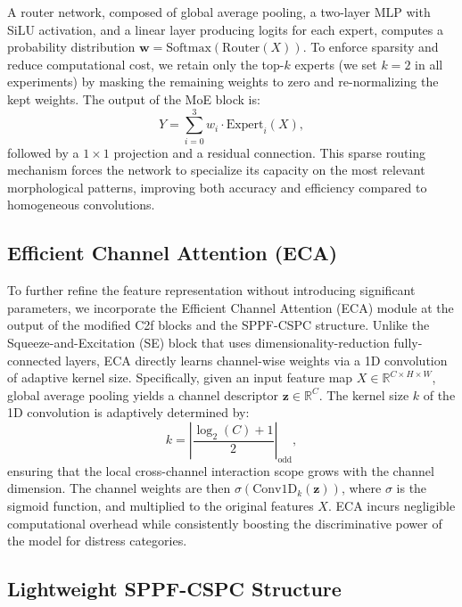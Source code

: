 \documentclass{ieeeaccess}
\begin{document}
{A router network, composed of global average pooling, a two-layer MLP with SiLU activation, and a linear layer producing logits for each expert, computes a probability distribution $\mathbf{w} = \text{Softmax}(\text{Router}(X))$. To enforce sparsity and reduce computational cost, we retain only the top-$k$ experts (we set $k=2$ in all experiments) by masking the remaining weights to zero and re-normalizing the kept weights. The output of the MoE block is:
\begin{equation}
Y = \sum_{i=0}^{3} w_i \cdot \text{Expert}_i(X),
\end{equation}
followed by a $1\times1$ projection and a residual connection. This sparse routing mechanism forces the network to specialize its capacity on the most relevant morphological patterns, improving both accuracy and efficiency compared to homogeneous convolutions.

\subsection{Efficient Channel Attention (ECA)}

To further refine the feature representation without introducing significant parameters, we incorporate the Efficient Channel Attention (ECA) module at the output of the modified C2f blocks and the SPPF-CSPC structure. Unlike the Squeeze-and-Excitation (SE) block that uses dimensionality-reduction fully-connected layers, ECA directly learns channel-wise weights via a 1D convolution of adaptive kernel size. Specifically, given an input feature map $X \in \mathbb{R}^{C \times H \times W}$, global average pooling yields a channel descriptor $\mathbf{z} \in \mathbb{R}^C$. The kernel size $k$ of the 1D convolution is adaptively determined by:
\begin{equation}
k = \left| \frac{\log_2(C) + 1}{2} \right|_{\text{odd}},
\end{equation}
ensuring that the local cross-channel interaction scope grows with the channel dimension. The channel weights are then $\sigma(\text{Conv1D}_{k}(\mathbf{z}))$, where $\sigma$ is the sigmoid function, and multiplied to the original features $X$. ECA incurs negligible computational overhead while consistently boosting the discriminative power of the model for distress categories.

\subsection{Lightweight SPPF-CSPC Structure}

}
\end{document}
